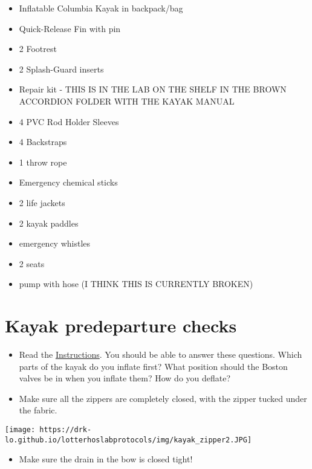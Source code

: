 \documentclass[
  letterpaper,
  DIV=11,
  numbers=noendperiod]{scrreprt}
\providecommand{\tightlist}{%
  \setlength{\itemsep}{0pt}\setlength{\parskip}{0pt}}\usepackage{longtable,booktabs,array}
\begin{document}
\begin{itemize}
\item
  Inflatable Columbia Kayak in backpack/bag
\item
  Quick-Release Fin with pin
\item
  2 Footrest
\item
  2 Splash-Guard inserts
\item
  Repair kit - THIS IS IN THE LAB ON THE SHELF IN THE BROWN ACCORDION
  FOLDER WITH THE KAYAK MANUAL
\item
  4 PVC Rod Holder Sleeves
\item
  4 Backstraps
\item
  1 throw rope
\item
  Emergency chemical sticks
\item
  2 life jackets
\item
  2 kayak paddles
\item
  emergency whistles
\item
  2 seats
\item
  pump with hose (I THINK THIS IS CURRENTLY BROKEN)
\end{itemize}

\hypertarget{kayak-predeparture-checks}{%
\section*{Kayak predeparture checks}\label{kayak-predeparture-checks}}

\begin{itemize}
\item
  Read the
  \href{https://drk-lo.github.io/lotterhoslabprotocols/img/kayak_Aquaglide_Manual_2017.pdf}{Instructions}.
  You should be able to answer these questions. Which parts of the kayak
  do you inflate first? What position should the Boston valves be in
  when you inflate them? How do you deflate?
\item
  Make sure all the zippers are completely closed, with the zipper
  tucked under the fabric.
\end{itemize}

\texttt{[image: https://drk-lo.github.io/lotterhoslabprotocols/img/kayak\_zipper2.JPG]}

\begin{itemize}
\tightlist
\item
  Make sure the drain in the bow is closed tight!
\end{itemize}
\end{document}
